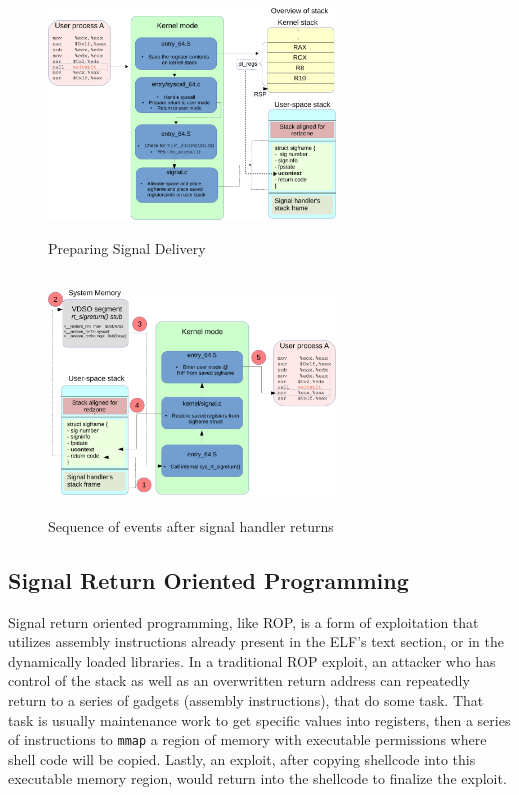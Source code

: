 \documentclass{sig-alternate-05-2015}
\begin{document}
\begin{figure}
\centering
\includegraphics[height=2.5in, width=3in]{3.pdf}
\caption{Preparing Signal Delivery}
\label{fig:sig1}
\end{figure}

\begin{figure}
\centering
\includegraphics[height=2.5in, width=3in]{4.pdf}
\caption{Sequence of events after signal handler returns}
\label{fig:sig2}
\end{figure}

\subsection{Signal Return Oriented Programming}
Signal return oriented programming, like ROP, is a form of exploitation that utilizes assembly instructions already present in the ELF's text section, or in the dynamically loaded libraries. In a traditional ROP exploit, an attacker who has control of the stack as well as an overwritten return address can repeatedly return to a series of gadgets (assembly instructions), that do some task. That task is usually maintenance work to get specific values into registers, then a series of instructions to \texttt{mmap} a region of memory with executable permissions where shell code will be copied. Lastly, an exploit, after copying shellcode into this executable memory region, would return into the shellcode to finalize the exploit.
\end{document}
